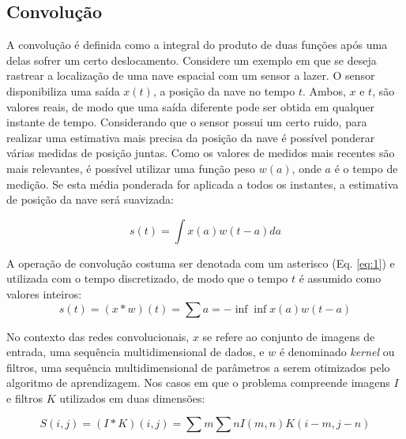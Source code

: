 \subsection{Convolução}
A convolução é definida como a integral do produto de duas funções após uma delas sofrer um
certo deslocamento. Considere um exemplo em que se deseja rastrear a localização de uma
nave espacial com um sensor a lazer. O sensor disponibiliza uma saída $x(t)$, a posição da nave
no tempo $t$. Ambos, $x$ e $t$, são valores reais, de modo que uma saída diferente pode ser obtida
em qualquer instante de tempo. Considerando que o sensor possui um certo ruido, para realizar uma
estimativa mais precisa da posição da nave é possível ponderar várias medidas de posição juntas.
Como os valores de medidos mais recentes são mais relevantes, é possível utilizar uma função peso
$w(a)$, onde $a$ é o tempo de medição. Se esta média ponderada for aplicada a todos os instantes,
a estimativa de posição da nave será suavizada:

\begin{equation}
 s(t) = \int{x(a) w(t-a)da}
 \label{eq:1}
\end{equation}

A operação de convolução costuma ser denotada com um asterisco (Eq. \ref{eq:1}) e utilizada com o tempo
discretizado, de modo que o tempo $t$ é assumido como valores inteiros:
\begin{equation}
 s(t) = (x * w)(t) = \sum{a=-\inf}{\inf}{x(a)w(t-a)}
 \label{eq:1}
\end{equation}

No contexto das redes convolucionais, $x$ se refere ao conjunto de imagens de entrada, uma sequência multidimensional
de dados, e $w$ é denominado \textit{kernel} ou filtros, uma sequência multidimensional de parâmetros 
a serem otimizados pelo algoritmo de aprendizagem.
Nos casos em que o problema compreende imagens $I$ e filtros $K$ utilizados em duas dimensões:

\begin{equation}
 S(i,j) = (I*K)(i,j) = \sum{m}\sum{n}{I(m,n)K(i-m,j-n)}
\end{equation}


